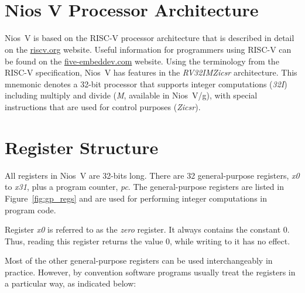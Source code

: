 \documentclass[11pt, twoside, pdftex]{article}
\begin{document}
\newpage
\section{Nios\textsuperscript{\textregistered} V Processor Architecture}

Nios~V is based on the RISC-V processor architecture that is described in detail on
the {\small \href{https://www.riscv.org} {riscv.org}} website. Useful information for
programmers using RISC-V can be found on the 
{\small \href{https://five-embeddev.com} {five-embeddev.com}} website.
Using the terminology from the RISC-V specification, Nios~V has features in
the {\it RV32IMZicsr} architecture. This mnemonic denotes a 32-bit processor that supports 
integer computations ({\it 32I}) including multiply and divide ({\it M}, available in
Nios~V/g), with special instructions that are used for control purposes ({\it Zicsr}). 

\section{Register Structure}
\label{sec:registers}

All registers in Nios~V are 32-bits long. There are 32 general-purpose registers, 
{\it x0} to {\it x31}, plus a program counter, {\it pc}. The general-purpose registers
are listed in Figure~\ref{fig:gp_regs} 
and are used for performing integer computations in program code. 

Register {\it x0} is referred to as the {\it zero} register.  It always contains the 
constant 0. Thus, reading this register returns the value 0, while writing to it has no effect.  

Most of the other general-purpose registers can be used interchangeably in practice. However, 
by convention software programs usually treat the registers in a particular way, as indicated
below:
\end{document}
